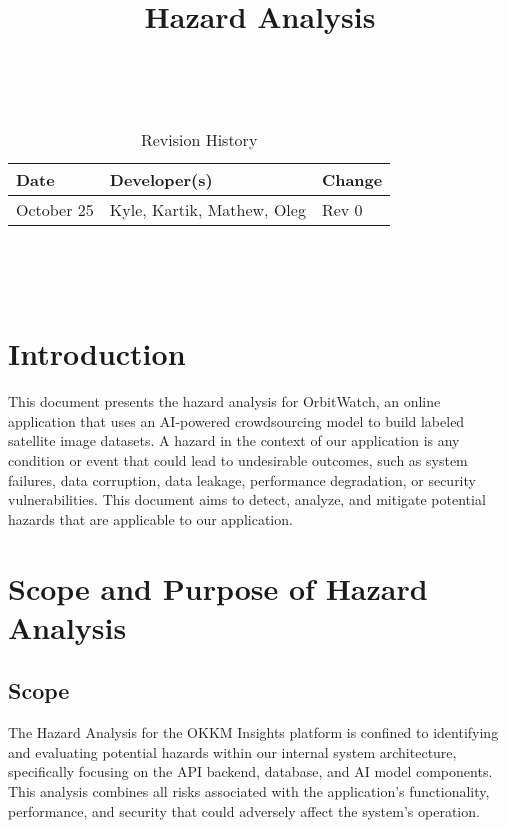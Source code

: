 \documentclass{article}
\title{Hazard Analysis\\\progname}
\author{\authname}
\date{}
\begin{document}
\maketitle
\thispagestyle{empty}

~\newpage


\begin{table}[hp]
\caption{Revision History} \label{TblRevisionHistory}
\begin{tabularx}{\textwidth}{llX}
\toprule
\textbf{Date} & \textbf{Developer(s)} & \textbf{Change}\\
\midrule
October 25 & Kyle, Kartik, Mathew, Oleg & Rev 0\\
\bottomrule
\end{tabularx}
\end{table}

~\newpage

\tableofcontents

~\newpage



\section{Introduction}
This document presents the hazard analysis for OrbitWatch, an online application that uses an AI-powered crowdsourcing model to build labeled satellite image datasets.
A hazard in the context of our application is any condition or event that could lead to undesirable outcomes, such as system failures, data corruption, data leakage, performance degradation, or security vulnerabilities.
This document aims to detect, analyze, and mitigate potential hazards that are applicable to our application.

\section{Scope and Purpose of Hazard Analysis}

\subsection{Scope}
The Hazard Analysis for the OKKM Insights platform is confined to identifying and evaluating potential hazards within our internal system architecture, specifically focusing on the API backend, database, and AI model components. This analysis combines all risks associated with the application's functionality, performance, and security that could adversely affect the system's operation.
\end{document}
